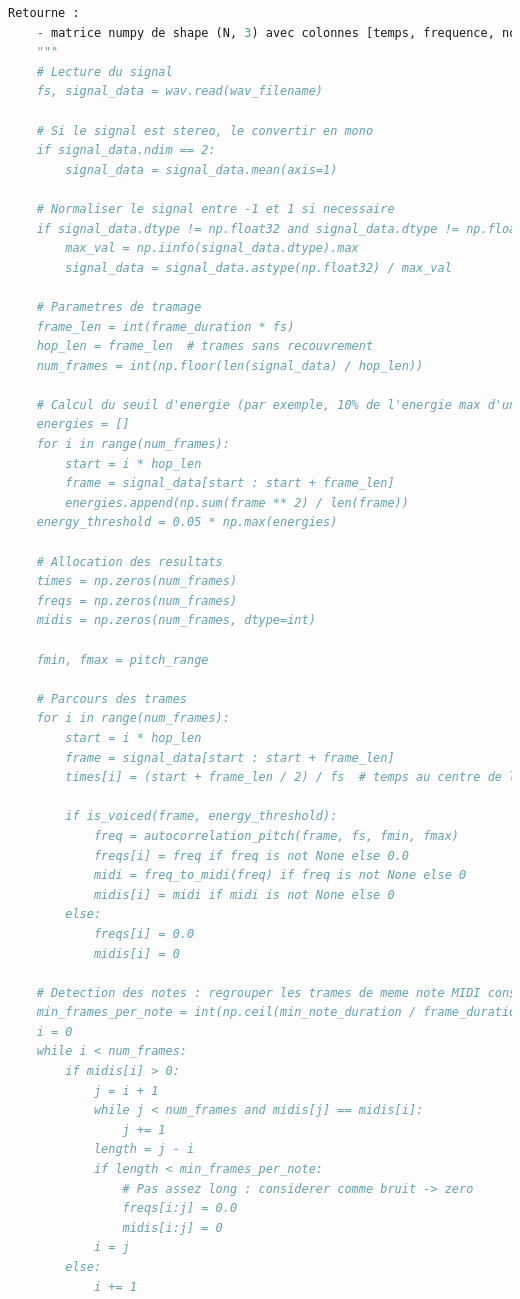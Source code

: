 \begin{lstlisting}[language=python]
    Retourne :
    - matrice numpy de shape (N, 3) avec colonnes [temps, frequence, note_MIDI]
    """
    # Lecture du signal
    fs, signal_data = wav.read(wav_filename)

    # Si le signal est stereo, le convertir en mono
    if signal_data.ndim == 2:
        signal_data = signal_data.mean(axis=1)

    # Normaliser le signal entre -1 et 1 si necessaire
    if signal_data.dtype != np.float32 and signal_data.dtype != np.float64:
        max_val = np.iinfo(signal_data.dtype).max
        signal_data = signal_data.astype(np.float32) / max_val

    # Parametres de tramage
    frame_len = int(frame_duration * fs)
    hop_len = frame_len  # trames sans recouvrement
    num_frames = int(np.floor(len(signal_data) / hop_len))

    # Calcul du seuil d'energie (par exemple, 10% de l'energie max d'une trame)
    energies = []
    for i in range(num_frames):
        start = i * hop_len
        frame = signal_data[start : start + frame_len]
        energies.append(np.sum(frame ** 2) / len(frame))
    energy_threshold = 0.05 * np.max(energies)

    # Allocation des resultats
    times = np.zeros(num_frames)
    freqs = np.zeros(num_frames)
    midis = np.zeros(num_frames, dtype=int)

    fmin, fmax = pitch_range

    # Parcours des trames
    for i in range(num_frames):
        start = i * hop_len
        frame = signal_data[start : start + frame_len]
        times[i] = (start + frame_len / 2) / fs  # temps au centre de la trame

        if is_voiced(frame, energy_threshold):
            freq = autocorrelation_pitch(frame, fs, fmin, fmax)
            freqs[i] = freq if freq is not None else 0.0
            midi = freq_to_midi(freq) if freq is not None else 0
            midis[i] = midi if midi is not None else 0
        else:
            freqs[i] = 0.0
            midis[i] = 0

    # Detection des notes : regrouper les trames de meme note MIDI consecutives
    min_frames_per_note = int(np.ceil(min_note_duration / frame_duration))
    i = 0
    while i < num_frames:
        if midis[i] > 0:
            j = i + 1
            while j < num_frames and midis[j] == midis[i]:
                j += 1
            length = j - i
            if length < min_frames_per_note:
                # Pas assez long : considerer comme bruit -> zero
                freqs[i:j] = 0.0
                midis[i:j] = 0
            i = j
        else:
            i += 1


\end{lstlisting}
